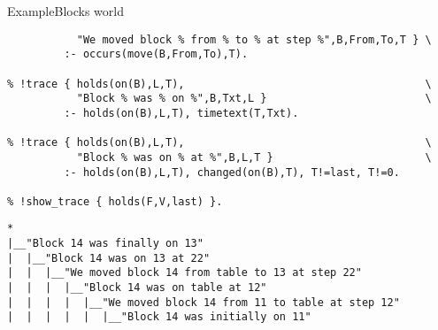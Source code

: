 \begin{frame}{Example}{Blocks world}
\begin{lstlisting}[language=clingo,commentstyle={\color{white}},basicstyle=\scriptsize\ttfamily]
% !trace { occurs(move(B,From,To),T),                             \
           "We moved block % from % to % at step %",B,From,To,T } \
         :- occurs(move(B,From,To),T).

% !trace { holds(on(B),L,T),                                      \
           "Block % was % on %",B,Txt,L }                         \
         :- holds(on(B),L,T), timetext(T,Txt).

% !trace { holds(on(B),L,T),                                      \
           "Block % was on % at %",B,L,T }                        \
         :- holds(on(B),L,T), changed(on(B),T), T!=last, T!=0.

% !show_trace { holds(F,V,last) }.
\end{lstlisting}
\pause
\begin{lstlisting}[language=clingo,basicstyle=\scriptsize\ttfamily]
*
|__"Block 14 was finally on 13"
|  |__"Block 14 was on 13 at 22"
|  |  |__"We moved block 14 from table to 13 at step 22"
|  |  |  |__"Block 14 was on table at 12"
|  |  |  |  |__"We moved block 14 from 11 to table at step 12"
|  |  |  |  |  |__"Block 14 was initially on 11"
\end{lstlisting}
\end{frame}
%
